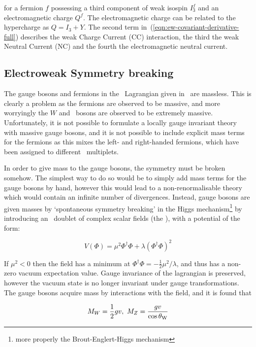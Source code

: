 for a fermion $f$ possessing a third component of weak isospin $I_{3}^{f}$
and an electromagnetic charge $Q^{f}$. The electromagnetic charge can be related
to the hypercharge as $Q = I_{3} + Y$. The second term
in~(\ref{eqn:ew-covariant-derivative-full}) describes the weak Charge Current (CC)
interaction, the third the weak Neutral Current (NC) and the fourth the
electromagnetic neutral current.

\subsection{Electroweak Symmetry breaking}

The gauge bosons and fermions in the \ew\ Lagrangian given
in~ are massless. This is clearly a problem as the fermions
are observed to be massive, and more worryingly the $W$ and \Z\ bosons are
observed to be extremely massive. Unfortunately, it is not possible to formulate a locally gauge invariant theory with massive
gauge bosons, and it is not possible to include explicit mass terms for the
fermions as this mixes the left- and right-handed fermions, which have been
assigned to different \sutwo\ multiplets. 

In order to give
mass to the gauge bosons, the symmetry must be broken somehow. The simplest way
to do so would be to simply add mass terms for the gauge bosons by hand, however
this would lead to a non-renormalisable theory which would contain an infinite
number of divergences. Instead, gauge bosons are given masses by `spontaneous
symmetry breaking' in the Higgs mechanism\footnote{more properly the Brout-Englert-Higgs
mechanism} by introducing an \sutwo\ doublet of complex scalar fields (the ), with a potential of the form:

\begin{equation}
V(\Phi) =  \mu^{2}\Phi^{\dagger}\Phi + \lambda(\Phi^{\dagger}\Phi)^{2}
\end{equation}

If $\mu^{2} < 0$ then the field has a minimum at $\Phi^{\dagger}\Phi = -
\frac{1}{2} \mu^{2}/\lambda$, and thus has a non-zero vacuum expectation value. 
Gauge invariance of the lagrangian is preserved, however the vacuum state is no
longer invariant under gauge transformations.
The gauge bosons acquire mass by interactions with the field, and it is found
that

\begin{equation}
M_{W} = \frac{1}{2}gv, \ M_{Z} = \frac{gv}{\cos{\ensuremath{\theta_{\mathrm{W}}}}}
\end{equation}

